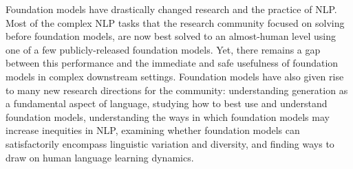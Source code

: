 Foundation models have drastically changed research and the practice of NLP.
Most of the complex NLP tasks that the research community focused on solving before foundation models, are now best solved to an almost-human level using one of a few publicly-released foundation models. Yet, there remains a gap between this performance and the immediate and safe usefulness of foundation models in complex downstream settings. Foundation models have also given rise to many new research directions for the community: understanding generation as a fundamental aspect of language, studying how to best use and understand foundation models, understanding the ways in which foundation models may increase inequities in NLP,  examining whether foundation models can satisfactorily encompass linguistic variation and diversity, and finding ways to draw on human language learning dynamics. 